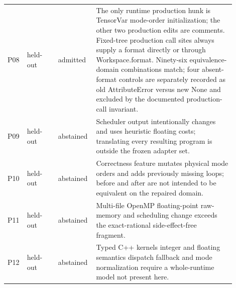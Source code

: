 \begin{longtable}{@{}p{0.055\linewidth}p{0.13\linewidth}p{0.13\linewidth}p{0.585\linewidth}@{}}
P08 & held-out & admitted & The only runtime production hunk is TensorVar mode-order initialization; the other two production edits are comments. Fixed-tree production call sites always supply a format directly or through Workspace.format. Ninety-six equivalence-domain combinations match; four absent-format controls are separately recorded as old AttributeError versus new None and excluded by the documented production-call invariant.\\
P09 & held-out & abstained & Scheduler output intentionally changes and uses heuristic floating costs; translating every resulting program is outside the frozen adapter set.\\
P10 & held-out & abstained & Correctness feature mutates physical mode orders and adds previously missing loops; before and after are not intended to be equivalent on the repaired domain.\\
P11 & held-out & abstained & Multi-file OpenMP floating-point raw-memory and scheduling change exceeds the exact-rational side-effect-free fragment.\\
P12 & held-out & abstained & Typed C++ kernels integer and floating semantics dispatch fallback and mode normalization require a whole-runtime model not present here.\\
\end{longtable}
